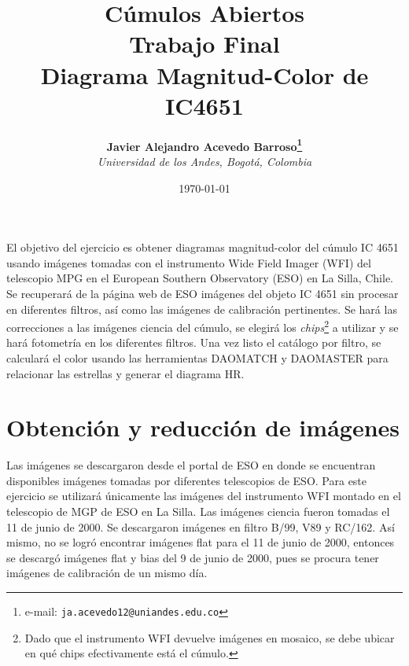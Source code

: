 \documentclass[12pt]{article}
\begin{document}
\title{Cúmulos Abiertos \\ Trabajo Final \\ Diagrama Magnitud-Color de IC4651}

\author{
\textbf{Javier Alejandro Acevedo Barroso\thanks{e-mail: \texttt{ja.acevedo12@uniandes.edu.co}}}\\
\textit{Universidad de los Andes, Bogotá, Colombia}\\
 }%

\date{\today}
\maketitle %


\normalsize
\newpage

El objetivo del ejercicio es obtener diagramas magnitud-color del cúmulo IC 4651 usando imágenes tomadas con el instrumento Wide Field Imager (WFI) del telescopio MPG en el European Southern Observatory (ESO) en La Silla, Chile.
Se recuperará de la página web de ESO imágenes del objeto IC 4651 sin procesar en diferentes filtros, así como las imágenes de calibración pertinentes. 
Se hará las correcciones a las imágenes ciencia del cúmulo, se elegirá los \emph{chips}\footnote{Dado que el instrumento WFI devuelve imágenes en mosaico, se debe ubicar en qué chips efectivamente está el cúmulo.} a utilizar y se hará fotometría en los diferentes filtros.
Una vez listo el catálogo por filtro, se calculará el color usando las herramientas DAOMATCH y DAOMASTER para relacionar las estrellas y generar el diagrama HR.


\section{Obtención y reducción de imágenes}
Las imágenes se descargaron desde el portal de ESO en donde se encuentran disponibles imágenes tomadas por diferentes telescopios de ESO. Para este ejercicio se utilizará únicamente las imágenes del instrumento WFI montado en el telescopio de MGP de ESO en La Silla. Las imágenes ciencia fueron tomadas el 11 de junio de 2000. Se descargaron imágenes en filtro B/99, V89 y RC/162. Así mismo, no se logró encontrar imágenes flat para el 11 de junio de 2000, entonces se descargó imágenes flat y bias del 9 de junio de 2000, pues se procura tener imágenes de calibración de un mismo día.
\end{document}
